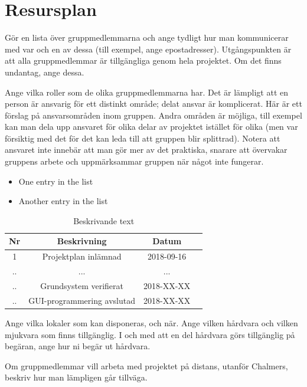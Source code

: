 \documentclass{article}
\begin{document}
\section{Resursplan}
Gör en lista över gruppmedlemmarna och ange tydligt hur man kommunicerar
med var och en av dessa (till exempel, ange epostadresser). Utgångspunkten är
att alla gruppmedlemmar är tillgängliga genom hela projektet. Om det finns
undantag, ange dessa.\par
Ange vilka roller som de olika gruppmedlemmarna har. Det är lämpligt att
en person är ansvarig för ett distinkt område; delat ansvar är komplicerat. Här
är ett förslag på ansvarsområden inom gruppen. Andra områden är möjliga, till
exempel kan man dela upp ansvaret för olika delar av projektet istället för olika
(men var försiktig med det för det kan leda till att gruppen blir splittrad). Notera
att ansvaret inte innebär att man gör mer av det praktiska, snarare att övervakar
gruppens arbete och uppmärksammar gruppen när något inte fungerar.

\begin{itemize}
  \item One entry in the list
  \item Another entry in the list
\end{itemize}

\begin{table}[!h]
\begin{center}
\begin{tabular}{ |c|c|c|c| } 
\hline
Nr & Beskrivning & Datum \\
\hline\hline
1 & Projektplan inlämnad & 2018-09-16 \\
\hline
.. & ... & ... \\
\hline
.. & Grundsystem verifierat & 2018-XX-XX \\ 
\hline
.. & GUI-programmering avslutad & 2018-XX-XX \\ 
\hline
\end{tabular}
\caption{Beskrivande text}
\label{table1}
\end{center}
\end{table}

Ange vilka lokaler som kan disponeras, och när. Ange vilken hårdvara och
vilken mjukvara som finns tillgänglig. I och med att en del hårdvara görs tillgänglig på begäran, ange hur ni begär ut hårdvara.\par
Om gruppmedlemmar vill arbeta med projektet på distans, utanför Chalmers, beskriv hur man lämpligen går tillväga.
\end{document}
